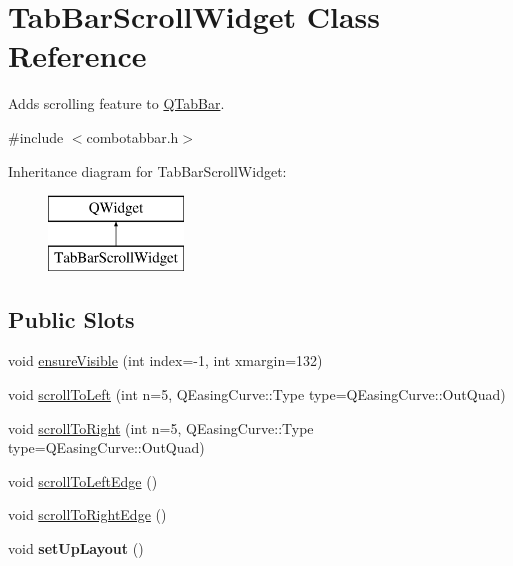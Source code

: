 \hypertarget{class_tab_bar_scroll_widget}{
\section{TabBarScrollWidget Class Reference}
\label{class_tab_bar_scroll_widget}
}


Adds scrolling feature to \hyperlink{class_q_tab_bar}{QTabBar}.  




{\ttfamily \#include $<$combotabbar.h$>$}

Inheritance diagram for TabBarScrollWidget:\begin{figure}[H]
\begin{center}
\leavevmode
\includegraphics[height=2cm]{class_tab_bar_scroll_widget}
\end{center}
\end{figure}
\subsection*{Public Slots}
\begin{DoxyCompactItemize}
\item 
void \hyperlink{class_tab_bar_scroll_widget_a05bdaea447574f7fb718cd353e98400b}{ensureVisible} (int index=-\/1, int xmargin=132)
\item 
void \hyperlink{class_tab_bar_scroll_widget_a525f4d6a01724eab689c59e35a134789}{scrollToLeft} (int n=5, QEasingCurve::Type type=QEasingCurve::OutQuad)
\item 
void \hyperlink{class_tab_bar_scroll_widget_aae5b0963318e3b84a301df74fcfceb3e}{scrollToRight} (int n=5, QEasingCurve::Type type=QEasingCurve::OutQuad)
\item 
void \hyperlink{class_tab_bar_scroll_widget_aef9cc5e3e46b87fa9a039e62cdadc999}{scrollToLeftEdge} ()
\item 
void \hyperlink{class_tab_bar_scroll_widget_a8c700b63b084d5fec121ff07061763f6}{scrollToRightEdge} ()
\item 
\hypertarget{class_tab_bar_scroll_widget_aa3803469255e43631cc765f42b48f5b8}{
void {\bfseries setUpLayout} ()}
\label{class_tab_bar_scroll_widget_aa3803469255e43631cc765f42b48f5b8}

\end{DoxyCompactItemize}
